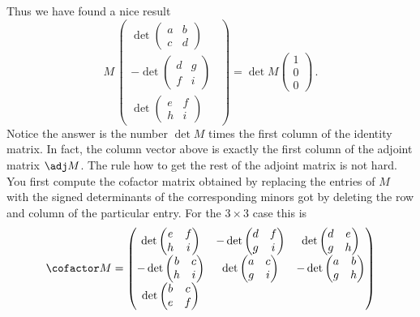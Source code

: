 {Thus we have found a nice result
\[
M \, \begin{pmatrix} \det\begin{pmatrix}a&b\\c&d\end{pmatrix}\\[2mm]
-\det\begin{pmatrix}d&g\\f&i\end{pmatrix}\ \ \\[2mm]
\det\begin{pmatrix}e&f\\h&i\end{pmatrix}\end{pmatrix}
=\det M \begin{pmatrix}1\\0\\0\end{pmatrix}\, .
\]
Notice the answer is the number $\det M$ times the first column of the identity matrix.
In fact, the column vector above is exactly the first column of the adjoint matrix $\adj M$.
The rule how to get the rest of the adjoint matrix is not hard. You first compute the cofactor matrix obtained by replacing the entries of $M$ with the signed determinants of the corresponding 
minors got by deleting the row and column of the particular entry. For the $3\times 3$ case this is
\[
\cofactor M = 
\begin{pmatrix} \det\begin{pmatrix}e&f\\h&i\end{pmatrix}
&-\det\begin{pmatrix}d&f\\g&i\end{pmatrix}
&\det\begin{pmatrix}d&e\\g&h\end{pmatrix}
\\[2mm]
-\det\begin{pmatrix}b&c\\h&i\end{pmatrix}
&\det\begin{pmatrix}a&c\\g&i\end{pmatrix}
&-\det\begin{pmatrix}a&b\\g&h\end{pmatrix}\\[2mm]
\det\begin{pmatrix}b&c\\e&f\end{pmatrix}

\end{pmatrix}\]}
